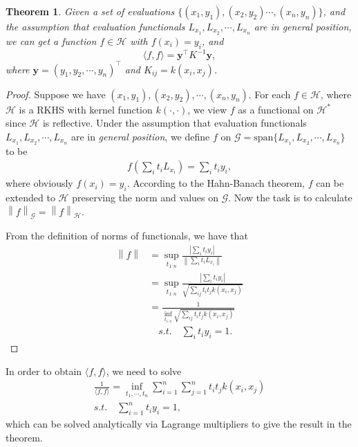 \documentclass[a4paper]{article}
\newcommand{\up}{\mathrm}
\renewcommand{\bf}{\mathbf}
\renewcommand{\cal}{\mathcal}
\newcommand{\norm}[1]{\left\lVert#1\right\rVert}
\newcommand{\T}{\intercal}
\newtheorem{theorem}{Theorem}
\begin{document}
\begin{theorem}
Given a set of evaluations $\{(x_1,y_1),(x_2,y_2)\cdots,(x_n,y_n)\}$, and the assumption that evaluation functionals $L_{x_1},L_{x_2},\cdots,L_{x_n}$ are in general position, we can get a function $f \in \cal{H}$ with $f(x_i) = y_i$, and 
\begin{equation}
\langle f,f\rangle = \bf{y}^\T K^{-1}\bf{y},
\end{equation}
where $\bf{y} = (y_1,y_2,\cdots,y_n)^\T$ and $K_{ij} = k(x_i,x_j)$.
\end{theorem}
\begin{proof}
Suppose we have $(x_1,y_1),(x_2,y_2),\cdots,(x_n,y_n)$. For each $f \in \cal{H}$, where $\cal{H}$ is a RKHS with kernel function $k(\cdot,\cdot)$, we view $f$ as a functional on $\cal{H}^*$ since $\cal{H}$ is reflective. Under the assumption that evaluation functionals $L_{x_1},L_{x_2},\cdots,L_{x_n}$ are in \textit{general position}, we define $f$ on $\cal{G} = \up{span} \{L_{x_1},L_{x_2},\cdots,L_{x_n}\}$ to be 
\begin{align}
f(\sum_i t_i L_{x_i}) = \sum_i t_i y_i,
\end{align}
where obviously $f(x_i) = y_i$. According to the Hahn-Banach theorem, $f$ can be extended to $\cal{H}$ preserving the norm and values on $\cal{G}$. Now the task is to calculate $\norm{f}_{\cal{G}} = \norm{f}_{\cal{H}}$.

From the definition of norms of functionals, we have that
\begin{align}
\norm{f} &= \sup_{t_{1:n}} \frac{|\sum_i t_i y_i|}{\norm{\sum_i t_i L_{x_i}}}\\
&= \sup_{t_{1:n}} \frac{|\sum_i t_i y_i|}{\sqrt{\sum_{ij} t_i t_j k(x_i,x_j)}}\\
&= \frac{1}{\inf_{t_{1:n}} \sqrt{\sum_{ij} t_i t_j k(x_i,x_j)}}\\
& \quad s.t. \quad \sum_i t_i y_i = 1.
\end{align}
\end{proof}
In order to obtain $\langle f,f\rangle$, we need to solve
\begin{gather*}
\frac{1}{\langle f,f\rangle} = \inf_{t_1,\cdots,t_n} \sum_{i=1}^n\sum_{j=1}^n t_it_j k(x_i,x_j)\\
s.t.\quad \sum_{i=1}^n t_i y_i = 1,
\end{gather*}
which can be solved analytically via Lagrange multipliers to give the result in the theorem.
\end{document}

